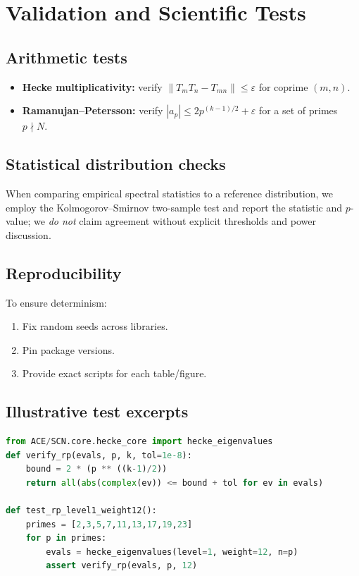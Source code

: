 \documentclass[11pt]{article}
\theoremstyle{definition}
\theoremstyle{remark}
\newcommand{\norm}[1]{\left\lVert #1 \right\rVert}
\newcommand{\abs}[1]{\left\lvert #1 \right\rvert}
\begin{document}
\section{Validation and Scientific Tests}
\label{sec:validation}

\subsection{Arithmetic tests}
\begin{itemize}[leftmargin=*,itemsep=2pt]
  \item \textbf{Hecke multiplicativity:} verify \(\norm{T_mT_n - T_{mn}}\le \varepsilon\) for coprime \((m,n)\).
  \item \textbf{Ramanujan--Petersson:} verify \(\abs{a_p}\le 2p^{(k-1)/2}+\varepsilon\) for a set of primes \(p\nmid N\).
\end{itemize}

\subsection{Statistical distribution checks}
When comparing empirical spectral statistics to a reference distribution, we employ the Kolmogorov--Smirnov two-sample test and report the statistic and \(p\)-value; we \emph{do not} claim agreement without explicit thresholds and power discussion.

\subsection{Reproducibility}
To ensure determinism:
\begin{enumerate}[leftmargin=*,itemsep=2pt]
  \item Fix random seeds across libraries.
  \item Pin package versions.
  \item Provide exact scripts for each table/figure.
\end{enumerate}

\subsection{Illustrative test excerpts}
\begin{lstlisting}[language=Python,caption={Ramanujan--Petersson bound test.}]
from ACE/SCN.core.hecke_core import hecke_eigenvalues
def verify_rp(evals, p, k, tol=1e-8):
    bound = 2 * (p ** ((k-1)/2))
    return all(abs(complex(ev)) <= bound + tol for ev in evals)

def test_rp_level1_weight12():
    primes = [2,3,5,7,11,13,17,19,23]
    for p in primes:
        evals = hecke_eigenvalues(level=1, weight=12, n=p)
        assert verify_rp(evals, p, 12)
\end{lstlisting}
\end{document}
